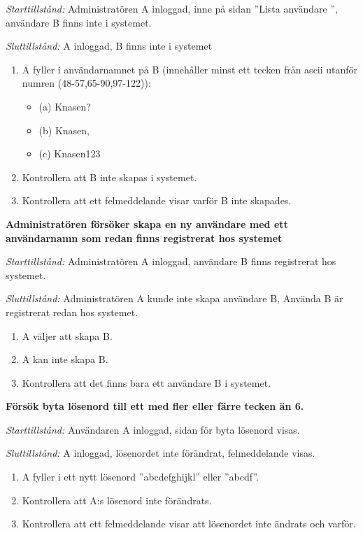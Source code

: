\documentclass[a4paper]{article}
\begin{document}
\begin{FT}
\emph{Starttillstånd:} Administratören A inloggad, inne på sidan ''Lista användare '', användare B finns inte i systemet.

\emph{Sluttillstånd:} A inloggad, B finns inte i systemet

\begin{enumerate}
\item A fyller i användarnamnet på B (innehåller minst ett tecken från ascii utanför numren (48-57,65-90,97-122)):
\begin{itemize}
\item [] (a) Knasen? %
\item [] (b) Knasen,
\item [] (c) Knasen123
\end{itemize}
\item Kontrollera att B inte skapas i systemet.
\item Kontrollera att ett felmeddelande visar varför B inte skapades.
\end{enumerate}

\item
\textbf{Administratören försöker skapa en ny användare med ett användarnamn som redan finns registrerat hos systemet}

\emph{Starttillstånd:} Administratören A inloggad, användare B finns registrerat hos systemet.

\emph{Sluttillstånd:} Administratören A kunde inte skapa användare B, Använda B är registrerat redan hos systemet.

\begin{enumerate}
\item A väljer att skapa B.
\item A kan inte skapa B.
\item Kontrollera att det finns bara ett användare B i systemet.
\end{enumerate}

\item
\textbf{Försök byta lösenord till ett med fler eller färre tecken än 6.}

\emph{Starttillstånd:} Användaren A inloggad, sidan för byta lösenord visas.

\emph{Sluttillstånd:} A inloggad, lösenordet inte förändrat, felmeddelande visas.

\begin{enumerate}
\item A fyller i ett nytt lösenord ''abcdefghijkl'' eller ''abcdf''.
\item Kontrollera att A:s lösenord inte förändrats.
\item Kontrollera att ett felmeddelande visar att lösenordet inte ändrats och varför.
\end{enumerate}


\end{FT}
\end{document}
